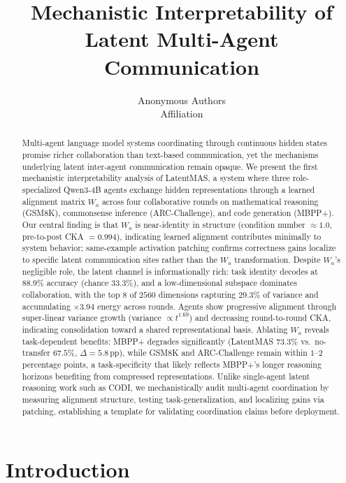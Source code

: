 \documentclass{article}
\title{Mechanistic Interpretability of Latent Multi-Agent Communication}
\author{%
  Anonymous Authors \\
  Affiliation \\
}
\begin{document}
\maketitle

\begin{abstract}
Multi-agent language model systems coordinating through continuous hidden states promise richer collaboration than text-based communication, yet the mechanisms underlying latent inter-agent communication remain opaque. We present the first mechanistic interpretability analysis of LatentMAS, a system where three role-specialized Qwen3-4B agents exchange hidden representations through a learned alignment matrix $W_a$ across four collaborative rounds on mathematical reasoning (GSM8K), commonsense inference (ARC-Challenge), and code generation (MBPP+). Our central finding is that $W_a$ is near-identity in structure (condition number $\approx 1.0$, pre-to-post CKA $= 0.994$), indicating learned alignment contributes minimally to system behavior; same-example activation patching confirms correctness gains localize to specific latent communication sites rather than the $W_a$ transformation. Despite $W_a$'s negligible role, the latent channel is informationally rich: task identity decodes at $88.9\%$ accuracy (chance $33.3\%$), and a low-dimensional subspace dominates collaboration, with the top $8$ of $2560$ dimensions capturing $29.3\%$ of variance and accumulating $\times 3.94$ energy across rounds. Agents show progressive alignment through super-linear variance growth (variance $\propto t^{1.69}$) and decreasing round-to-round CKA, indicating consolidation toward a shared representational basis. Ablating $W_a$ reveals task-dependent benefits: MBPP+ degrades significantly (LatentMAS $73.3\%$ vs.\ no-transfer $67.5\%$, $\Delta=5.8$\,pp), while GSM8K and ARC-Challenge remain within $1$--$2$ percentage points, a task-specificity that likely reflects MBPP+'s longer reasoning horizons benefiting from compressed representations. Unlike single-agent latent reasoning work such as CODI, we mechanistically audit multi-agent coordination by measuring alignment structure, testing task-generalization, and localizing gains via patching, establishing a template for validating coordination claims before deployment.
\end{abstract}

\section{Introduction}
\label{sec:intro}
\end{document}

